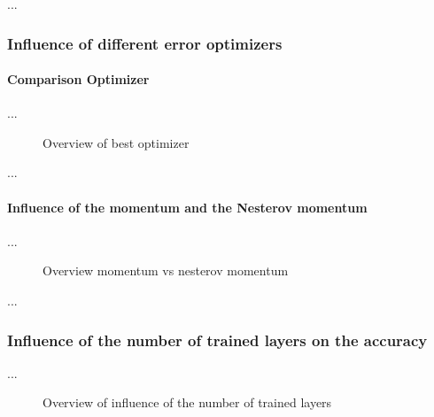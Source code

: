 \documentclass[10pt]{article}
\newcommand\inputpgf[2]{{
\let\pgfimageWithoutPath\pgfimage
\renewcommand{\pgfimage}[2][]{\pgfimageWithoutPath[##1]{#1/##2}}

}}
\begin{document}
				\noindent ...

			\subsubsection{Influence of different error optimizers}

				\paragraph{Comparison Optimizer}

				\noindent ...

				\begin{figure}[H]
					\begin{center}
						
					\end{center}
					\caption{Overview of best optimizer}
					\label{fig:evaluation_momentum}
				\end{figure}

				\noindent ...

				\paragraph{Influence of the momentum and the Nesterov momentum}

				\noindent ...

				\begin{figure}[H]
					\begin{center}
						\inputpgf{images/evaluation}{momentum.pgf}
					\end{center}
					\caption{Overview momentum vs nesterov momentum}
					\label{fig:evaluation_momentum}
				\end{figure}

				\noindent ...
		
			\subsubsection{Influence of the number of trained layers on the accuracy}
	
				\noindent ...

				\begin{figure}[H]
					\begin{center}
						\inputpgf{images/evaluation}{number_trainable_layers.pgf}
					\end{center}
					\caption{Overview of influence of the number of trained layers}
					\label{fig:evaluation_number_trainable_layers}
				\end{figure}
\end{document}
